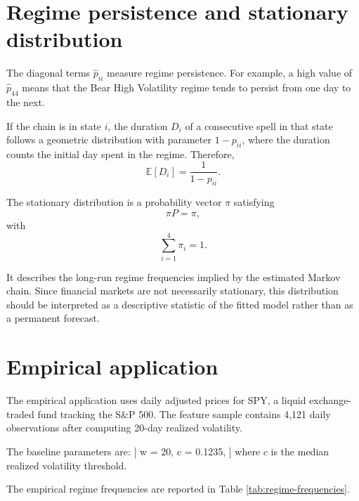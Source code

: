 \documentclass[11pt,a4paper]{article}
\newcommand{\E}{\mathbb{E}}
\begin{document}
\section{Regime persistence and stationary distribution}

The diagonal terms $\widehat p_{ii}$ measure regime persistence. For example, a high value of $\widehat p_{44}$ means that the Bear High Volatility regime tends to persist from one day to the next.

If the chain is in state $i$, the duration $D_i$ of a consecutive spell in that state follows a geometric distribution with parameter $1-p_{ii}$, where the duration counts the initial day spent in the regime. Therefore,
\begin{equation}
\E[D_i]
=
\frac{1}{1-p_{ii}}.
\end{equation}

The stationary distribution is a probability vector $\pi$ satisfying
\begin{equation}
\pi P = \pi,
\end{equation}
with
\begin{equation}
\sum_{i=1}^{4}\pi_i = 1.
\end{equation}

It describes the long-run regime frequencies implied by the estimated Markov chain. Since financial markets are not necessarily stationary, this distribution should be interpreted as a descriptive statistic of the fitted model rather than as a permanent forecast.

\section{Empirical application}

The empirical application uses daily adjusted prices for SPY, a liquid exchange-traded fund tracking the S&P 500. The feature sample contains 4,121 daily observations after computing 20-day realized volatility.

The baseline parameters are:
[
w = 20,
\qquad
c = 0.1235,
]
where $c$ is the median realized volatility threshold.

The empirical regime frequencies are reported in Table \ref{tab:regime-frequencies}.
\end{document}

